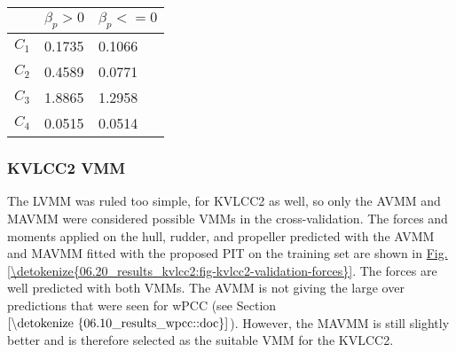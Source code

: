 \documentclass[review]{elsarticle}
\begin{document}
 \begin{savenotes}\sphinxattablestart
 \centering
 \sphinxthecaptionisattop
 \label{\detokenize{06.20_results_kvlcc2:id1}}
 \sphinxaftertopcaption
 \begin{tabulary}{\linewidth}[t]{|T|T|T|}
 \hline
 \sphinxstyletheadfamily &\sphinxstyletheadfamily 
 
 \(\beta_p>0\)
 &\sphinxstyletheadfamily 
 
 \(\beta_p<=0\)
 \\
 \hline
 
 \(C_1\)
 &
 
 \sphinxhyphen{}0.1735
 &
 
 \sphinxhyphen{}0.1066
 \\
 \hline
 
 \(C_2\)
 &
 
 0.4589
 &
 
 0.0771
 \\
 \hline
 
 \(C_3\)
 &
 
 \sphinxhyphen{}1.8865
 &
 
 1.2958
 \\
 \hline
 
 \(C_4\)
 &
 
 0.0515
 &
 
 0.0514
 \\
 \hline
 \end{tabulary}
 \par
 \sphinxattableend\end{savenotes}


\subsubsection{KVLCC2 VMM}
\label{\detokenize{06.20_results_kvlcc2:kvlcc2-vmm}}
  
The LVMM was ruled too simple, for KVLCC2 as well, so only the AVMM and MAVMM were considered possible VMMs in the cross-validation.
The forces and moments applied on the hull, rudder, and propeller predicted with the AVMM and MAVMM fitted with the proposed PIT on the training set are shown in \hyperref[\detokenize{06.20_results_kvlcc2:fig-kvlcc2-validation-forces}]{Fig.\@ \ref{\detokenize{06.20_results_kvlcc2:fig-kvlcc2-validation-forces}}}.
The forces are well predicted with both VMMs. The AVMM is not giving the large over predictions that were seen for wPCC (see Section \(\ref{\detokenize{06.10_results_wpcc::doc}}\)). However, the MAVMM is still slightly better and is therefore selected as the suitable VMM for the KVLCC2.
\end{document}
